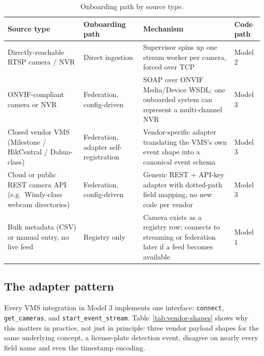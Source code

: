 \documentclass[11pt,a4paper]{article}
\begin{document}
\begin{table}[h]
\centering
\small
\begin{tabular}{L{3.0cm}L{4.0cm}L{4.2cm}L{2.6cm}}
\toprule
\textbf{Source type} & \textbf{Onboarding path} & \textbf{Mechanism} & \textbf{Code path} \\
\midrule
Directly-reachable RTSP camera / NVR & Direct ingestion & Supervisor spins up one stream worker per camera, forced over TCP & Model 2 \\
ONVIF-compliant camera or NVR & Federation, config-driven & SOAP over ONVIF Media/Device WSDL; one onboarded system can represent a multi-channel NVR & Model 3 \\
Closed vendor VMS (Milestone / HikCentral / Dahua-class) & Federation, adapter self-registration & Vendor-specific adapter translating the VMS's own event shape into a canonical event schema & Model 3 \\
Cloud or public REST camera API (e.g.\ Windy-class webcam directories) & Federation, config-driven & Generic REST + API-key adapter with dotted-path field mapping, no new code per vendor & Model 3 \\
Bulk metadata (CSV) or manual entry, no live feed & Registry only & Camera exists as a registry row; connects to streaming or federation later if a feed becomes available & Model 1 \\
\bottomrule
\end{tabular}
\caption{Onboarding path by source type.}
\label{tab:onboarding-paths}
\end{table}

\subsection{The adapter pattern}

Every VMS integration in Model 3 implements one interface: \texttt{connect}, \texttt{get\_cameras},
and \texttt{start\_event\_stream}. Table~\ref{tab:vendor-shapes}
shows why this matters in practice, not just in principle: three vendor
payload shapes for the same underlying concept, a license-plate detection
event, disagree on nearly every field name and even the timestamp encoding.
\end{document}
